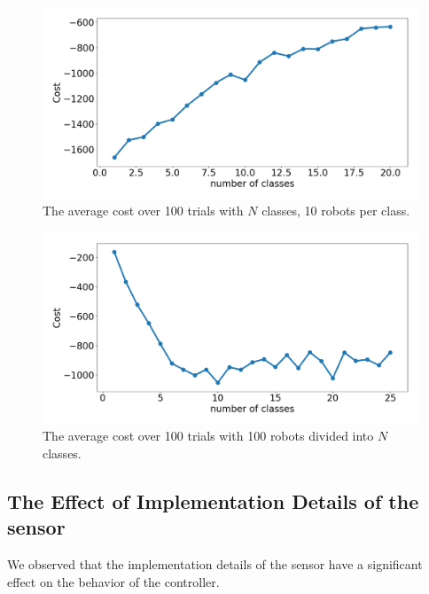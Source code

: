 \documentclass[letterpaper, 10 pt, conference]{ieeeconf}
\begin{document}
\begin{figure}[t]
  \centering
  \includegraphics[width=1\linewidth]{./images/num_classes_vs_cost_10_per_class.png}
  \caption{The average cost over 100 trials with $N$ classes, 10 robots per class.}
  \label{fig:num_classes_10}
\end{figure}

\begin{figure}[t]
  \centering
  \includegraphics[width=1\linewidth]{./images/num_classes_vs_cost_100_robots.png}
  \caption{The average cost over 100 trials with 100 robots divided into $N$ classes.}
  \label{fig:num_classes_100}
\end{figure}

\subsection{The Effect of Implementation Details of the sensor} \label{section:sensor_impl}

We observed that the implementation details of the sensor have a significant
effect on the behavior of the controller.
\end{document}
